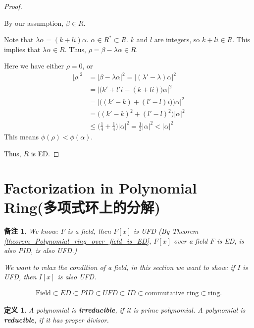 \documentclass[utf8]{ctexbook}
\newtheorem{definition}{定义}[section]
\newtheorem{memo}{备注}[section]
\begin{document}
\begin{proof}
\begin{enumerate}
{By our assumption, $\beta \in R$.

Note that $\lambda \alpha = (k + l i) \alpha$. $\alpha \in R^* \subset R$. $k$ and $l$ are integers, so $k + l i \in R$. This implies that $\lambda \alpha \in R$. Thus, $ \rho = \beta - \lambda \alpha \in R $.

Here we have either $\rho =0$, or 
\begin{align*}
| \rho |^2 & = | \beta - \lambda \alpha |^2 = | (\lambda' - \lambda) \alpha |^2 \\
& = | \Big( k' + l' i - (k + l i) \Big) \alpha |^2 \\
& = | \Big( (k' - k) + (l' - l) i) \Big) \alpha |^2 \\
& = \Big( (k' - k)^2 + (l' - l)^2 \Big) | \alpha|^2 \\
& \leq \Big( \frac{1}{4} + \frac{1}{4} \Big) | \alpha|^2 = \frac{1}{2} | \alpha|^2  < | \alpha|^2 
\end{align*}
This means $\phi(\rho) < \phi(\alpha)$.
}
\end{enumerate}

Thus, $R$ is ED.

\end{proof}

\section{Factorization in Polynomial Ring(多项式环上的分解)}

\begin{memo}
We know: $F$ is a field, then $F[x]$ is UFD (By Theorem \ref{theorem_Polynomial_ring_over_field_is_ED}, $F[x]$ over a field $F$ is ED, is also PID, is also UFD.)

We want to relax the condition of a field, in this section we want to show: if $I$ is UFD, then $I[x]$ is also UFD.

\begin{align*}
\mbox{Field} \subset ED \subset PID \subset UFD \subset ID \subset \mbox{commutative ring} \subset \mbox{ring} .
\end{align*}

\end{memo}

\begin{definition}
A polynomial is \textbf{irreducible}, if it is prime polynomial. A polynomial is \textbf{reducible}, if it has proper divisor.
\end{definition}
\end{document}
